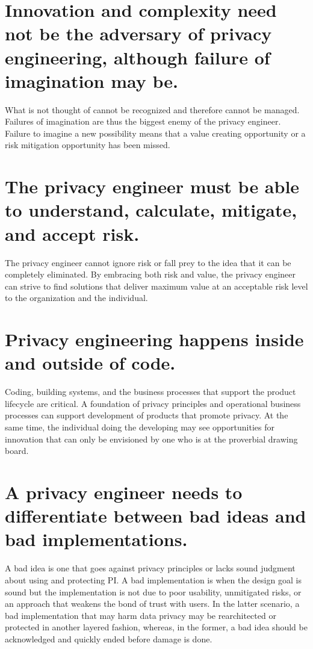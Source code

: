 \documentclass[letterpaper,12pt,english]{sphinxmanual}
\begin{document}
\section{Innovation and complexity need not be the adversary of privacy engineering, although failure of imagination may be.}
\label{privacy:innovation-and-complexity-need-not-be-the-adversary-of-privacy-engineering-although-failure-of-imagination-may-be}
What is not thought of cannot be recognized and therefore cannot be managed. Failures of imagination are thus the biggest enemy of the privacy engineer. Failure to imagine a new possibility means that a value creating opportunity or a risk mitigation opportunity has been missed.


\section{The privacy engineer must be able to understand, calculate, mitigate, and accept risk.}
\label{privacy:the-privacy-engineer-must-be-able-to-understand-calculate-mitigate-and-accept-risk}
The privacy engineer cannot ignore risk or fall prey to the idea that it can be completely eliminated. By embracing both risk and value, the privacy engineer can strive to find solutions that deliver maximum value at an acceptable risk level to the organization and the individual.


\section{Privacy engineering happens inside and outside of code.}
\label{privacy:privacy-engineering-happens-inside-and-outside-of-code}
Coding, building systems, and the business processes that support the product lifecycle are critical. A foundation of privacy principles and operational business processes can support development of products that promote privacy. At the same time, the individual doing the developing may see opportunities for innovation that can only be envisioned by one who is at the proverbial drawing board.


\section{A privacy engineer needs to differentiate between bad ideas and bad implementations.}
\label{privacy:a-privacy-engineer-needs-to-differentiate-between-bad-ideas-and-bad-implementations}
A bad idea is one that goes against privacy principles or lacks sound judgment about using and protecting PI. A bad implementation is when the design goal is sound but the implementation is not due to poor usability, unmitigated risks, or an approach that weakens the bond of trust with users. In the latter scenario, a bad implementation that may harm data privacy may be rearchitected or protected in another layered fashion, whereas, in the former, a bad idea should be acknowledged and quickly ended before damage is done.
\end{document}

